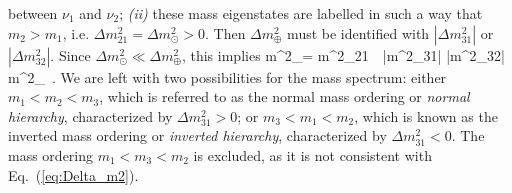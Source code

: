 between $\nu_1$ and $\nu_2$; {\it (ii)} these mass eigenstates are labelled
in such a way that $m_2 > m_1$, i.e. $\Delta m^2_{21} = \Delta m^2_\odot > 0$.
Then $\Delta m^2_\oplus$ must be identified with $|\Delta m^2_{31}|$ or $|\Delta m^2_{32}|$.
Since $\Delta m^2_\odot \ll \Delta m^2_\oplus$, this implies
%
\be
  \Delta m^2_\odot = \Delta m^2_{21}\, \ll\, |\Delta m^2_{31}| \simeq |\Delta m^2_{32}| \simeq \Delta m^2_\oplus\, .
\label{eq:Delta_m2}
\eeq
%
We are left with two possibilities for the mass spectrum: either $m_1 < m_2 < m_3$,
which is referred to as the normal mass ordering or {\it normal hierarchy}, characterized by
$\Delta m^2_{31} > 0$; or $m_3 < m_1 < m_2$, which is known as the inverted mass ordering
or {\it inverted hierarchy}, characterized by $\Delta m^2_{31} < 0$. The mass ordering
$m_1 < m_3 < m_2$ is excluded, as it is not consistent with Eq.~(\ref{eq:Delta_m2}).

